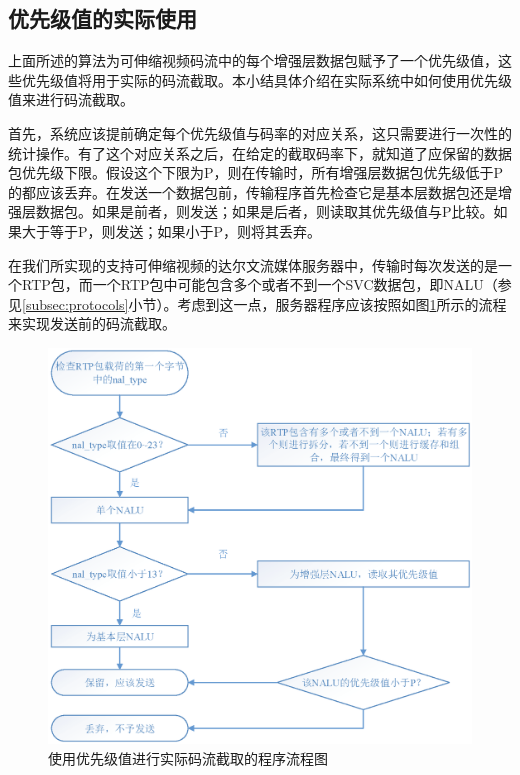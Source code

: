 \subsection{优先级值的实际使用}

上面所述的算法为可伸缩视频码流中的每个增强层数据包赋予了一个优先级值，这些优先级值将用于实际的码流截取。本小结具体介绍在实际系统中如何使用优先级值来进行码流截取。

首先，系统应该提前确定每个优先级值与码率的对应关系，这只需要进行一次性的统计操作。有了这个对应关系之后，在给定的截取码率下，就知道了应保留的数据包优先级下限。假设这个下限为P，则在传输时，所有增强层数据包优先级低于P的都应该丢弃。在发送一个数据包前，传输程序首先检查它是基本层数据包还是增强层数据包。如果是前者，则发送；如果是后者，则读取其优先级值与P比较。如果大于等于P，则发送；如果小于P，则将其丢弃。

在我们所实现的支持可伸缩视频的达尔文流媒体服务器中，传输时每次发送的是一个RTP包，而一个RTP包中可能包含多个或者不到一个SVC数据包，即NALU（参见\ref{subsec:protocols}小节）。考虑到这一点，服务器程序应该按照如图\ref{fig:extraction-flow}所示的流程来实现发送前的码流截取。

\begin{figure}[!ht]
	\centering
	\vspace{10pt}
	\includegraphics[width = 1.0\linewidth]{eps/extraction-flow}
	\caption{使用优先级值进行实际码流截取的程序流程图\label{fig:extraction-flow}}
\end{figure}

